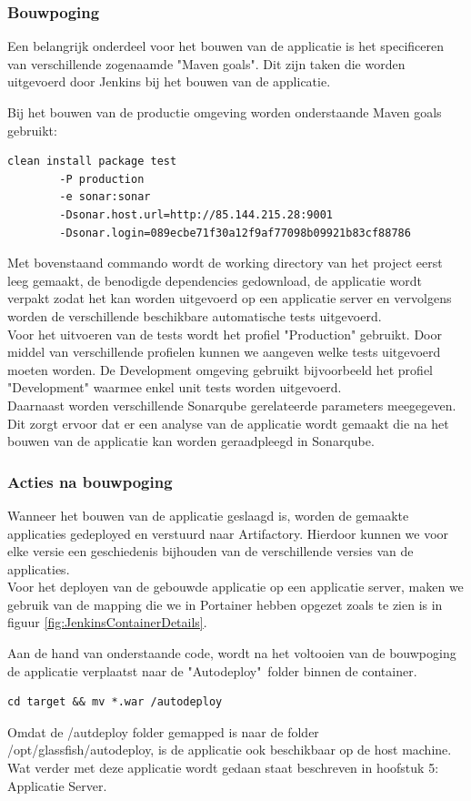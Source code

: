 \newpage
\subsubsection{Bouwpoging}
Een belangrijk onderdeel voor het bouwen van de applicatie is het specificeren van verschillende zogenaamde "Maven goals". Dit zijn taken die worden uitgevoerd door Jenkins bij het bouwen van de applicatie.

Bij het bouwen van de productie omgeving worden onderstaande Maven goals gebruikt: 
\begin{lstlisting}
clean install package test 
		-P production
		-e sonar:sonar 
		-Dsonar.host.url=http://85.144.215.28:9001 
		-Dsonar.login=089ecbe71f30a12f9af77098b09921b83cf88786
\end{lstlisting}

Met bovenstaand commando wordt de working directory van het project eerst leeg gemaakt, de benodigde dependencies gedownload, de applicatie wordt verpakt zodat het kan worden uitgevoerd op een applicatie server en vervolgens worden de verschillende beschikbare automatische tests uitgevoerd.
\\
Voor het uitvoeren van de tests wordt het profiel "Production" gebruikt. Door middel van verschillende profielen kunnen we aangeven welke tests uitgevoerd moeten worden. De Development omgeving gebruikt bijvoorbeeld het profiel "Development" waarmee enkel unit tests worden uitgevoerd.
\\
Daarnaast worden verschillende Sonarqube gerelateerde parameters meegegeven. Dit zorgt ervoor dat er een analyse van de applicatie wordt gemaakt die na het bouwen van de applicatie kan worden geraadpleegd in Sonarqube.
\newpage
\subsubsection{Acties na bouwpoging}
Wanneer het bouwen van de applicatie geslaagd is, worden de gemaakte applicaties gedeployed en verstuurd naar Artifactory. Hierdoor kunnen we voor elke versie een geschiedenis bijhouden van de verschillende versies van de applicaties.
\\
Voor het deployen van de gebouwde applicatie op een applicatie server, maken we gebruik van de mapping die we in Portainer hebben opgezet zoals te zien is in figuur \ref{fig:JenkinsContainerDetails}.

Aan de hand van onderstaande code, wordt na het voltooien van de bouwpoging de applicatie verplaatst naar de "Autodeploy"\ folder binnen de container.
\begin{lstlisting}
cd target && mv *.war /autodeploy
\end{lstlisting}
Omdat de /autdeploy folder gemapped is naar de folder /opt/glassfish/autodeploy, is de applicatie ook beschikbaar op de host machine. Wat verder met deze applicatie wordt gedaan staat beschreven in hoofstuk 5: Applicatie Server.



